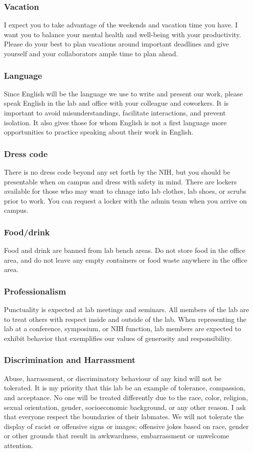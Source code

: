 \documentclass[10pt, a4paper, twocolumn]{article} %
\begin{document}
\subsubsection{Vacation} I expect you to take advantage of the weekends and vacation time you have. I want you to balance your mental health and well-being with your productivity. Please do your best to plan vacations around important deadlines and give yourself and your collaborators ample time to plan ahead.
\subsubsection{Language}
Since English will be the language we use to write and present our work, please speak English in the lab and office with your colleague and coworkers. It is important to avoid misunderstandings, facilitate interactions, and prevent isolation. It also gives those for whom English is not a first language more opportunities to practice speaking about their work in English.
\subsubsection{Dress code} There is no dress code beyond any set forth by the NIH, but you should be presentable when on campus and dress with safety in mind. There are lockers available for those who may want to chnage into lab clothes, lab shoes, or scrubs prior to work. You can request a locker with the admin team when you arrive on campus.
\subsubsection{Food/drink} Food and drink are banned from lab bench areas. Do not store food in the office area, and do not leave any empty containers or food waste anywhere in the office area.
\subsubsection{Professionalism} Punctuality is expected at lab meetings and seminars. All members of the lab are to treat others with respect inside and outside of the lab. When representing the lab at a conference, symposium, or NIH function, lab members are expected to exhibit behavior that exemplifies our values of generosity and responsibility.
\subsubsection{Discrimination and Harrassment}
Abuse, harrassment, or discriminatory behaviour of any kind will not be tolerated. It is my priority that this lab be an example of tolerance, compassion, and acceptance. No one will be treated differently due to the race, color, religion, sexual orientation, gender, socioeconomic background, or any other reason. I ask that everyone respect the boundaries of their labmates. We will not tolerate the display of racist or offensive signs or images; offensive jokes based on race, gender or other grounds that result in awkwardness, embarrassment or unwelcome attention.
\end{document}
